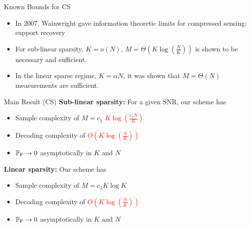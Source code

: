 \documentclass[final]{beamer}
\newlength{\onecolwid}
\newlength{\blockskip}
\newlength{\paraskip}
\begin{document}
\begin{frame}
\begin{columns}[t]
\begin{column}{\onecolwid}
 
    \begin{block}{\Large Known Bounds for CS}
	\begin{itemize}
	\item In 2007, Wainwright gave information theoretic limits for compressed sensing: support recovery
	 \item For sub-linear sparsity, $K=o(N)$, $M=\Theta\left( K\log(\frac{N}{K	})\right)$
		is shown to be necessary and sufficient.
	  \item In the linear sparse regime, $K=\alpha N$, it was shown that $M=\Theta(N)$ measurements are sufficient. \cite{Wainwright}
	 \end{itemize}
	 
   \begin{alertblock}{\Large Main Result (CS)} 
	    \textbf{Sub-linear sparsity: }For a given SNR, our scheme has 
			\begin{itemize}
			\itemsep10pt
				\item Sample complexity of $M=c_1$ \textcolor{red}{$K\log (\frac{c_2 N}{K})$}
				\item Decoding complexity of \textcolor{red}{$O\left(K\log(\frac{N}{K})\right)$} 
				\item $\mathbb{P}_{\text{F}}\rightarrow 0$ asymptotically in $K$ and $N$
			\end{itemize} 
\vspace{\paraskip}    
  
   \textbf{Linear sparsity: }Our scheme has 
		\begin{itemize}
		\itemsep10pt
			\item Sample complexity of $M=c_3 K\log K$
			\item Decoding complexity of \textcolor{red}{$O\left(K\log(\frac{N}{K})\right)$}
			\item $\mathbb{P}_{\text{F}}\rightarrow 0$ asymptotically in $K$ and $N$
		\end{itemize} 
    \end{alertblock}
 \end{block}
  \vspace{\blockskip}   
    

\end{column}
\end{columns}
\end{frame}
\end{document}
